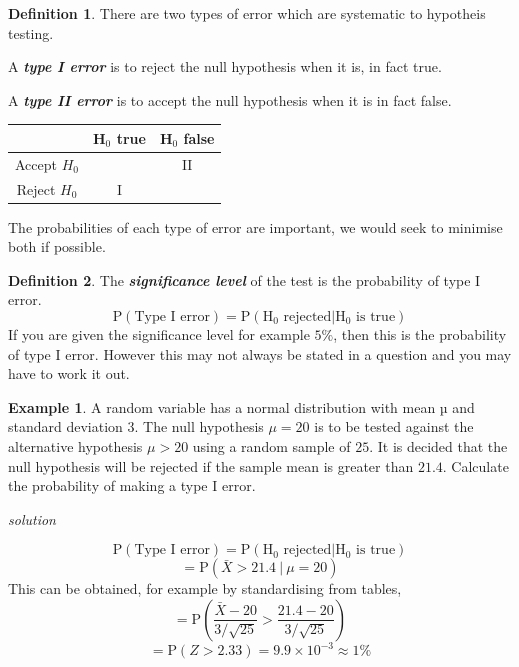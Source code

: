 \documentclass[
]{book}
\theoremstyle{definition}
\newtheorem{definition}{Definition}[chapter]
\theoremstyle{definition}
\newtheorem{example}{Example}[chapter]
\theoremstyle{definition}
\theoremstyle{definition}
\theoremstyle{remark}
\begin{document}
\begin{definition}

There are two types of error which are systematic to hypotheis testing.

A \textbf{\emph{type I error}} is to reject the null hypothesis when it is, in fact true.

A \textbf{\emph{type II error}} is to accept the null hypothesis when it is in fact false.

\begin{longtable}[]{@{}ccc@{}}
\toprule
& H\(_0\) true & H\(_0\) false\tabularnewline
\midrule
\endhead
Accept \(H_0\) & & II\tabularnewline
Reject \(H_0\) & I &\tabularnewline
\bottomrule
\end{longtable}

\end{definition}

The probabilities of each type of error are important, we would seek to minimise both if possible.

\begin{definition}
The \textbf{\emph{significance level}} of the test is the probability of type I error.
\[\text{P}(\text{Type I error}) = \text{P}(\text{H}_0 \text{ rejected} | \text{H}_0 \text{ is true})\]
If you are given the significance level for example \(5\%\), then this is the probability of type I error. However this may not always be stated in a question and you may have to work it out.
\end{definition}

\begin{example}
A random variable has a normal distribution with mean µ and standard deviation \(3\).
The null hypothesis \(\mu=20\) is to be tested against the alternative hypothesis \(\mu>20\) using a random sample of \(25\).
It is decided that the null hypothesis will be rejected if the sample mean is greater than \(21.4\).
Calculate the probability of making a type I error.

\emph{solution}

\[\text{P}(\text{Type I error}) = \text{P}(\text{H}_0 \text{ rejected} | \text{H}_0 \text{ is true})\]
\[=\text{P}(\bar{X} > 21.4 \ | \ \mu = 20)\]
This can be obtained, for example by standardising from tables,
\[=\text{P}\left(\frac{\bar{X}-20}{3/\sqrt{25}}>\frac{21.4-20}{3/\sqrt{25}} \right)\]
\[=\text{P}(Z>2.33) = 9.9\times 10^{-3} \approx 1\%\]
\end{example}
\end{document}
